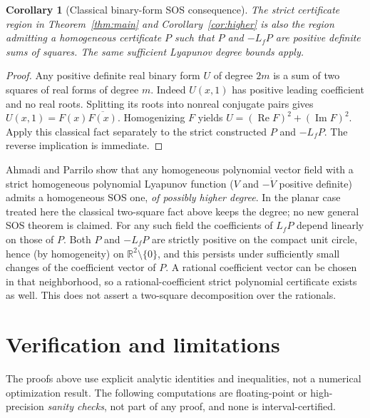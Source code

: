 \documentclass[11pt]{article}
\newtheorem{corollary}[theorem]{Corollary}
\theoremstyle{remark}\newtheorem{remark}[theorem]{Remark}
\newcommand{\R}{\mathbb R}
\newcommand{\Rea}{\operatorname{Re}}
\newcommand{\Ima}{\operatorname{Im}}
\begin{document}
\begin{corollary}[Classical binary-form SOS consequence]\label{cor:sos}
The strict certificate region in Theorem~\ref{thm:main} and
Corollary~\ref{cor:higher} is also the region admitting a
homogeneous certificate \(P\) such that \(P\) and \(-L_fP\)
are positive definite sums of squares.
The same sufficient Lyapunov degree bounds apply.
\end{corollary}
\begin{proof}
Any positive definite real binary form \(U\) of degree \(2m\)
is a sum of two squares of real forms of degree \(m\).
Indeed \(U(x,1)\) has positive leading coefficient and no real
roots. Splitting its roots into nonreal conjugate pairs gives
\(U(x,1)=F(x)\overline{F(x)}\). Homogenizing \(F\) yields
\(U=(\Rea F)^2+(\Ima F)^2\).
Apply this classical fact separately to the strict constructed
\(P\) and \(-L_fP\). The reverse implication is immediate.
\end{proof}
Ahmadi and Parrilo \cite[Theorem 5.3]{ahmadi-parrilo} show that any
homogeneous polynomial vector field with a strict homogeneous polynomial
Lyapunov function (\(V\) and \(-\dot V\) positive definite) admits a homogeneous SOS one, \emph{of possibly
higher degree}. In the planar case treated here the classical
two-square fact above keeps the degree; no new general SOS theorem is
claimed.
For any such field the coefficients of \(L_fP\) depend linearly on
those of \(P\). Both \(P\) and \(-L_fP\) are strictly positive on the compact
unit circle, hence (by homogeneity) on \(\R^2\setminus\{0\}\), and
this persists under sufficiently small changes of the coefficient vector
of \(P\). A rational coefficient vector can be chosen in that
neighborhood, so a rational-coefficient strict polynomial certificate
exists as well. This does not assert a two-square decomposition over the
rationals.

\section{Verification and limitations}\label{sec:verif}
The proofs above use explicit analytic identities and inequalities, not
a numerical optimization result. The following computations are
floating-point or high-precision \emph{sanity checks}, not part of any
proof, and none is interval-certified.
\end{document}
